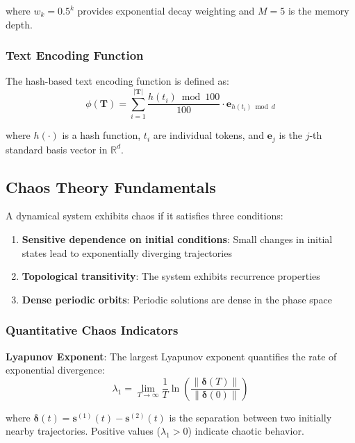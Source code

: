 \documentclass[11pt,a4paper]{article}
\begin{document}
where $w_k = 0.5^k$ provides exponential decay weighting and $M = 5$ is the memory depth.

\subsubsection{Text Encoding Function}

The hash-based text encoding function is defined as:
\begin{equation}
\phi(\mathbf{T}) = \sum_{i=1}^{|\mathbf{T}|} \frac{h(t_i) \bmod 100}{100} \cdot \mathbf{e}_{h(t_i) \bmod d}
\label{eq:text_encoding}
\end{equation}

where $h(\cdot)$ is a hash function, $t_i$ are individual tokens, and $\mathbf{e}_j$ is the $j$-th standard basis vector in $\mathbb{R}^d$.

\subsection{Chaos Theory Fundamentals}

A dynamical system exhibits chaos if it satisfies three conditions:

\begin{enumerate}
    \item \textbf{Sensitive dependence on initial conditions}: Small changes in initial states lead to exponentially diverging trajectories
    \item \textbf{Topological transitivity}: The system exhibits recurrence properties
    \item \textbf{Dense periodic orbits}: Periodic solutions are dense in the phase space
\end{enumerate}

\subsubsection{Quantitative Chaos Indicators}

\textbf{Lyapunov Exponent}: The largest Lyapunov exponent quantifies the rate of exponential divergence:
\begin{equation}
\lambda_1 = \lim_{T \to \infty} \frac{1}{T} \ln\left(\frac{\|\boldsymbol{\delta}(T)\|}{\|\boldsymbol{\delta}(0)\|}\right)
\label{eq:lyapunov}
\end{equation}

where $\boldsymbol{\delta}(t) = \mathbf{s}^{(1)}(t) - \mathbf{s}^{(2)}(t)$ is the separation between two initially nearby trajectories. Positive values ($\lambda_1 > 0$) indicate chaotic behavior.
\end{document}
